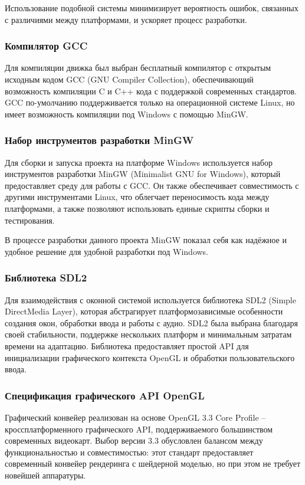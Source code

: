 Использование подобной системы минимизирует вероятность ошибок, связанных с различиями между платформами, и ускоряет процесс разработки.

\subsubsection{Компилятор GCC}

Для компиляции движка был выбран бесплатный компилятор с открытым исходным кодом GCC (GNU Compiler Collection), обеспечивающий возможность компиляции C и C++ кода с поддержкой современных стандартов. GCC по-умолчанию поддерживается только на операционной системе Linux, но имеет возможность компиляции под Windows с помощью MinGW.

\subsubsection{Набор инструментов разработки MinGW}

Для сборки и запуска проекта на платформе Windows используется набор инструментов разработки MinGW (Minimalist GNU for Windows), который предоставляет среду для работы с GCC. Он также обеспечивает совместимость с другими инструментами Linux, что облегчает переносимость кода между платформами, а также позволяют использовать единые скрипты сборки и тестирования.

В процессе разработки данного проекта MinGW показал себя как надёжное и удобное решение для удобной разработки под Windows.

\subsubsection{Библиотека SDL2}

Для взаимодействия с оконной системой используется библиотека SDL2 (Simple DirectMedia Layer), которая абстрагирует платформозависимые особенности создания окон, обработки ввода и работы с аудио. SDL2 была выбрана благодаря своей стабильности, поддержке нескольких платформ и минимальным затратам времени на адаптацию. Библиотека предоставляет простой API для инициализации графического контекста OpenGL и обработки пользовательского ввода.

\subsubsection{Спецификация графического API OpenGL}

Графический конвейер реализован на основе OpenGL 3.3 Core Profile -- кроссплатформенного графического API, поддерживаемого большинством современных видеокарт. Выбор версии 3.3 обусловлен балансом между функциональностью и совместимостью: этот стандарт предоставляет современный конвейер рендеринга с шейдерной моделью, но при этом не требует новейшей аппаратуры.

